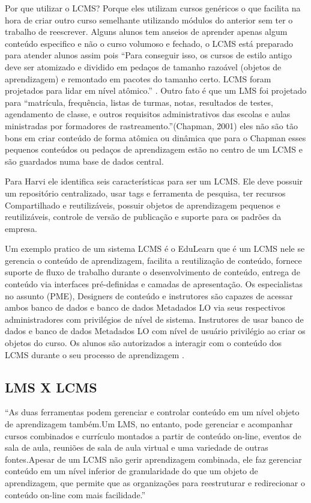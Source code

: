 \documentclass[12pt]{article}
\begin{document}
Por que utilizar o LCMS? Porque eles utilizam cursos genéricos o que facilita na hora de criar outro curso semelhante utilizando módulos do 
anterior sem ter o trabalho de reescrever. Alguns alunos tem anseios de aprender apenas algum conteúdo especifico e não o curso volumoso e fechado, 
o LCMS está preparado para atender alunos assim pois “Para conseguir isso, os cursos de estilo antigo deve ser atomizado e dividido em pedaços de 
tamanho razoável (objetos de aprendizagem) e remontado em pacotes do tamanho certo. LCMS foram projetados para lidar em nível atômico.” \cite{chapman2001learning}. 
Outro fato é que um LMS foi projetado para “matrícula, frequência, listas de turmas, notas, resultados de testes, agendamento de classe, e outros 
requisitos administrativos das escolas e aulas ministradas por formadores de rastreamento.”(Chapman, 2001) eles não são tão bons em criar conteúdo 
de forma atômica ou dinâmica que para o Chapman esses pequenos conteúdos ou pedaços de aprendizagem estão no centro de um LCMS e são guardados 
numa base de dados central.

Para Harvi ele identifica seis características para ser um LCMS. Ele deve possuir um repositório centralizado, usar tags e ferramenta de pesquisa, 
ter recursos Compartilhado e reutilizáveis, possuir objetos de aprendizagem pequenos e reutilizáveis, controle de versão de publicação e suporte 
para os padrões da empresa.


Um exemplo pratico de um sistema LCMS é o EduLearn que é um LCMS nele se gerencia o conteúdo de aprendizagem, facilita a reutilização de conteúdo, 
fornece suporte de fluxo de trabalho durante o desenvolvimento de conteúdo, entrega de conteúdo via interfaces pré-definidas e camadas de 
apresentação. Os especialistas no assunto (PME), Designers de conteúdo e instrutores são capazes de acessar ambos banco de dados e banco de dados 
Metadados LO via seus respectivos administradores com privilégios de nível de sistema. Instrutores de usar banco de dados e banco de dados 
Metadados LO com nível de usuário privilégio ao criar os objetos do curso. Os alunos são autorizados a interagir com o conteúdo dos LCMS durante o 
seu processo de aprendizagem \cite{prakash2009integrating}.

\subsection{LMS X LCMS}

“As duas ferramentas podem gerenciar e controlar conteúdo em um nível objeto de aprendizagem também.Um LMS, no entanto, pode gerenciar e 
acompanhar cursos combinados e currículo montados a partir de conteúdo on-line, eventos de sala de aula, reuniões de sala de aula virtual e uma 
variedade de outras fontes.Apesar de um LCMS não gerir aprendizagem combinada, ele faz gerenciar conteúdo em um nível inferior de granularidade do 
que um objeto de aprendizagem, que permite que as organizações para reestruturar e redirecionar o conteúdo on-line com mais facilidade.”
\end{document}
